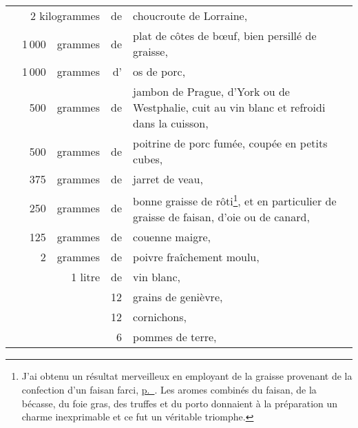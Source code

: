 \footnotesize
\begin{longtable}{rrrrp{16em}}
  & \multicolumn{2}{r}{2 kilogrammes} & de & choucroute de Lorraine,                                      \\
  & 1 000 & grammes & de & plat de côtes de bœuf, bien persillé de graisse,                               \\
  & 1 000 & grammes & d' & os de porc,                                                                    \\
  &   500 & grammes & de & jambon de Prague, d'York ou de Westphalie,
                           cuit au vin blanc et refroidi dans la cuisson,                                 \\
  &   500 & grammes & de & poitrine de porc fumée, coupée en petits cubes,                                \\
  &   375 & grammes & de & jarret de veau,                                                                \\
  &   250 & grammes & de & bonne graisse de rôti\footnote{J'ai obtenu un résultat
                           merveilleux en employant de la graisse provenant de la
                           confection d'un faisan farci, \hyperlink{p0636}{p. \pageref{pg0636}}. 
                           Les aromes combinés du faisan, de la bécasse, du foie gras, 
                           des truffes et du porto donnaient à la préparation un charme 
                           inexprimable et ce fut un véritable triomphe.}, et en particulier
                           de graisse de faisan, d'oie ou de canard,                                      \\
  &   125 & grammes & de & couenne maigre,                                                                \\
  &     2 & grammes & de & poivre fraîchement moulu,                                                      \\
  &       & 1 litre & de & vin blanc,                                                                     \\
  &       &         & 12 & grains de genièvre,                                                            \\
  &       &         & 12 & cornichons,                                                                    \\
  &       &         &  6 & pommes de terre,                                                               \\

\end{longtable}
